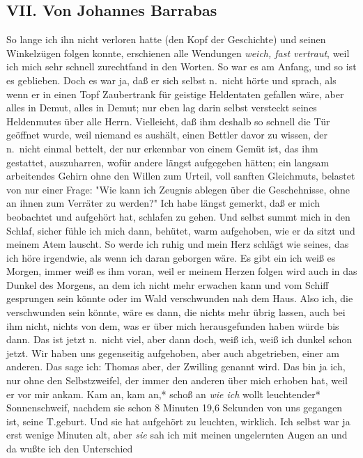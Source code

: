\documentclass[
]{article}
\author{}
\date{\vspace{-2.5em}}
\begin{document}
\subsection{VII. Von Johannes
Barrabas}\label{vii.-von-johannes-barrabas}

So lange ich ihn nicht verloren hatte (den Kopf der Geschichte) und
seinen Winkelzügen folgen konnte, erschienen alle Wendungen \emph{weich,
fast vertraut}, weil ich mich sehr schnell zurechtfand in den Worten. So
war es am Anfang, und so ist es geblieben. Doch es war ja, daß er sich
selbst n.~nicht hörte und sprach, als wenn er in einen Topf Zaubertrank
für geistige Heldentaten gefallen wäre, aber alles in Demut, alles in
Demut; nur eben lag darin selbst versteckt seines Heldenmutes über alle
Herrn. Vielleicht, daß ihm deshalb so schnell die Tür geöffnet wurde,
weil niemand es aushält, einen Bettler davor zu wissen, der n.~nicht
einmal bettelt, der nur erkennbar von einem Gemüt ist, das ihm
gestattet, auszuharren, wofür andere längst aufgegeben hätten; ein
langsam arbeitendes Gehirn ohne den Willen zum Urteil, voll sanften
Gleichmuts, belastet von nur einer Frage: "Wie kann ich Zeugnis ablegen
über die Geschehnisse, ohne an ihnen zum Verräter zu werden?" Ich habe
längst gemerkt, daß er mich beobachtet und aufgehört hat, schlafen zu
gehen. Und selbst summt mich in den Schlaf, sicher fühle ich mich dann,
behütet, warm aufgehoben, wie er da sitzt und meinem Atem lauscht. So
werde ich ruhig und mein Herz schlägt wie seines, das ich höre
irgendwie, als wenn ich daran geborgen wäre. Es gibt ein ich weiß es
Morgen, immer weiß es ihm voran, weil er meinem Herzen folgen wird auch
in das Dunkel des Morgens, an dem ich nicht mehr erwachen kann und vom
Schiff gesprungen sein könnte oder im Wald verschwunden nah dem Haus.
Also ich, die verschwunden sein könnte, wäre es dann, die nichts mehr
übrig lassen, auch bei ihm nicht, nichts von dem, was er über mich
herausgefunden haben würde bis dann. Das ist jetzt n.~nicht viel, aber
dann doch, weiß ich, weiß ich dunkel schon jetzt. Wir haben uns
gegenseitig aufgehoben, aber auch abgetrieben, einer am anderen. Das
sage ich: Thomas aber, der Zwilling genannt wird. Das bin ja ich, nur
ohne den Selbstzweifel, der immer den anderen über mich erhoben hat,
weil er vor mir ankam. Kam an, kam an,* schoß an \emph{wie ich }wollt
leuchtender* Sonnenschweif, nachdem sie schon 8 Minuten 19,6 Sekunden
von uns gegangen ist, seine T.geburt. Und sie hat aufgehört zu leuchten,
wirklich. Ich selbst war ja erst wenige Minuten alt, aber \emph{sie} sah
ich mit meinen ungelernten Augen an und da wußte ich den Unterschied
\end{document}
